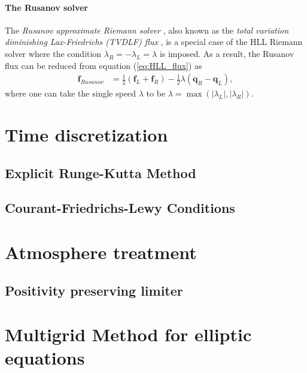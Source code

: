 \paragraph{The Rusanov solver}
The \textit{Rusanov approximate Riemann solver} \cite{rusanov1962calculation},
also known as the \textit{total variation diminishing Lax-Friedrichs (TVDLF) flux} \cite{shu1989efficient},
is a special case of the HLL Riemann solver where the condition $\lambda_R = -\lambda_L = \lambda$ is imposed.
As a result, the Rusanov flux can be reduced from equation (\ref{eq:HLL_flux}) as
\begin{align}
    \mathbf{f}_{Rusanov} &= \frac{1}{2}\left(\mathbf{f}_L + \mathbf{f}_R \right) - \frac{1}{2}\lambda \left(\mathbf{q}_R - \mathbf{q}_L \right),
\end{align}
where one can take the single speed $\lambda$ to be $\lambda = \max\left(|\lambda_L|,|\lambda_R| \right)$.


\section{Time discretization}
\subsection{Explicit Runge-Kutta Method}
\subsection{Courant-Friedrichs-Lewy Conditions}

\section{Atmosphere treatment}
\subsection{Positivity preserving limiter}

\section{Multigrid Method for elliptic equations} %
\label{section3.1}

